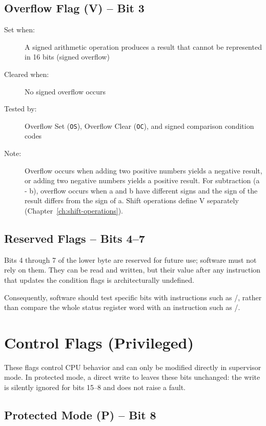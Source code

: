 \subsection{Overflow Flag (V) -- Bit 3}

\begin{description}
	\item[Set when:] A signed arithmetic operation produces a result that cannot be represented in 16 bits (signed overflow)
	\item[Cleared when:] No signed overflow occurs
	\item[Tested by:] Overflow Set (\texttt{OS}), Overflow Clear (\texttt{OC}), and signed comparison condition codes
	\item[Note:] Overflow occurs when adding two positive numbers yields a negative result, or adding two negative numbers yields
	      a positive result. For subtraction (a - b), overflow occurs when a and b have different signs and the sign of the
	      result differs from the sign of a. Shift operations define V separately (Chapter~\ref{ch:shift-operations}).
\end{description}

\subsection{Reserved Flags -- Bits 4--7}

Bits 4 through 7 of the lower byte are reserved for future use; software must not rely on them. They can be read and
written, but their value after any instruction that updates the condition flags is architecturally undefined.

Consequently, software should test specific bits with instructions such as /, rather than
compare the whole status register word with an instruction such as /.

\section{Control Flags (Privileged)}

These flags control CPU behavior and can only be modified directly in supervisor mode. In protected mode, a direct
write to  leaves these bits unchanged: the write is silently ignored for bits 15--8 and does not raise a fault.

\subsection{Protected Mode (P) -- Bit 8}

